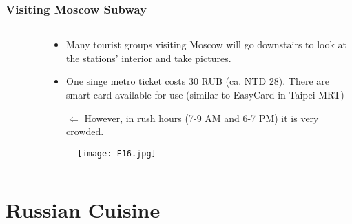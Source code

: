 \documentclass[pdflatex,compress,8pt,
	xcolor={dvipsnames,dvipsnames,svgnames,x11names,table},
	hyperref={colorlinks = true,breaklinks = true, urlcolor = NavyBlue, breaklinks = true}]{beamer}
\begin{document}
\begin{frame}\frametitle{Visiting Moscow Subway}
\begin{minipage}[0.4\textheight]{\textwidth}
\begin{columns}[T]
\begin{column}{0.5\textwidth}
\begin{figure}[H]
	\centering
			\vspace{3mm}
\end{figure}
\end{column}
\begin{column}{0.5\textwidth}
\begin{itemize}
	\item Many tourist groups visiting Moscow will go downstairs to look at the stations' interior and take pictures.
	\item One singe metro ticket costs 30 RUB (ca. NTD 28). There are smart-card available for use (similar to EasyCard in Taipei MRT)
	\item [$\Leftarrow$] However, in \alert{rush hours (7-9 AM and 6-7 PM)} it is \alert{very} crowded. 
\end{itemize}
\begin{figure}[H]
	\centering
		\texttt{[image: F16.jpg]}
\end{figure}
\end{column}
\end{columns}
\end{minipage}
\end{frame}

\section{Russian Cuisine}
\end{document}
